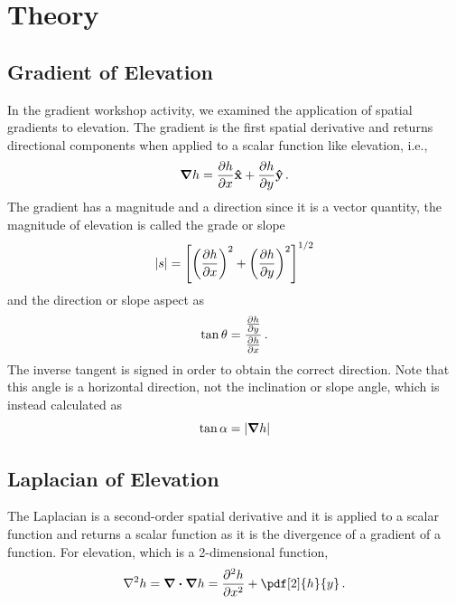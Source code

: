 \documentclass[final,a4paper,12pt]{article}
\begin{document}
\section*{Theory}
\subsection{Gradient of Elevation}
In the gradient workshop activity, we examined the application of spatial gradients to elevation.  The gradient is the first spatial derivative and returns directional components when applied to a scalar function like elevation, i.e.,
\[
  \grad{h} = \pdv{h}{x}\vu{x} + \pdv{h}{y}\vu{y}\, .
\]
The gradient has a magnitude and a direction since it is a vector quantity, the magnitude of elevation is called the grade or slope
\[
  |s| = \left[ \left( \pdv{h}{x} \right)^2 + \left( \pdv{h}{y} \right)^2 \right]^{1/2}
\]
and the direction or slope aspect as
\[
  \tan \theta = \frac{\pdv{h}{y}}{\pdv{h}{x}}\, .
\]
The inverse tangent is signed in order to obtain the correct direction.
Note that this angle is a horizontal direction, not the inclination or slope angle, which is instead calculated as
\[
  \tan \alpha = |\grad{h}|
\] 

\subsection*{Laplacian of Elevation}
The Laplacian is a second-order spatial derivative and it is applied to a scalar function and returns a scalar function as it is the divergence of a gradient of a function. For elevation, which is a 2-dimensional function,
\[
  \laplacian{h} = \div{\grad{h}} = \pdv[2]{h}{x} + \pdf[2]{h}{y}\, .
\]
\end{document}
